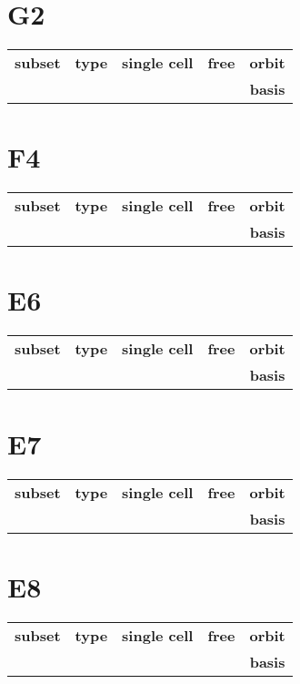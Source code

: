 \documentclass{article}
\newcommand{\resulttable}[1]{
  \section*{#1}
\begin{longtable}{llccc}
  \toprule
  \textbf{subset} & \textbf{type} & \textbf{single cell} & \textbf{free} & \textbf{orbit} \\
                  &               &                   &                & \textbf{basis} \\
  \midrule
  
  \bottomrule
\end{longtable}
}
\begin{document}
\resulttable{G2}
\resulttable{F4}\newpage
\resulttable{E6}\newpage
\resulttable{E7}\newpage
\resulttable{E8}
\end{document}
